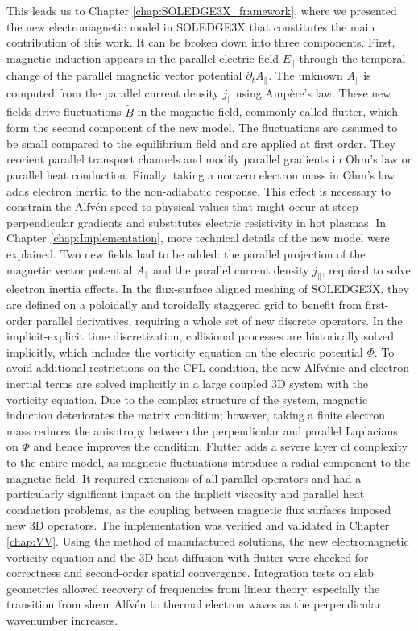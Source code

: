 This leads us to Chapter \ref{chap:SOLEDGE3X_framework}, where we presented the new electromagnetic model in SOLEDGE3X that constitutes the main contribution of this work. It can be broken down into three components. First, magnetic induction appears in the parallel electric field $E_\parallel$ through the temporal change of the parallel magnetic vector potential $\partial_t A_\parallel$. The unknown $A_\parallel$ is computed from the parallel current density $j_\parallel$ using Ampère's law. These new fields drive fluctuations $\tilde{B}$ in the magnetic field, commonly called flutter, which form the second component of the new model. The fluctuations are assumed to be small compared to the equilibrium field and are applied at first order. They reorient parallel transport channels and modify parallel gradients in Ohm's law or parallel heat conduction. Finally, taking a nonzero electron mass in Ohm's law adds electron inertia to the non-adiabatic response. This effect is necessary to constrain the Alfvén speed to physical values that might occur at steep perpendicular gradients and substitutes electric resistivity in hot plasmas. In Chapter \ref{chap:Implementation}, more technical details of the new model were explained. Two new fields had to be added: the parallel projection of the magnetic vector potential $A_\parallel$ and the parallel current density $j_\parallel$, required to solve electron inertia effects. In the flux-surface aligned meshing of SOLEDGE3X, they are defined on a poloidally and toroidally staggered grid to benefit from first-order parallel derivatives, requiring a whole set of new discrete operators. In the implicit-explicit time discretization, collisional processes are historically solved implicitly, which includes the vorticity equation on the electric potential $\Phi$. To avoid additional restrictions on the CFL condition, the new Alfvénic and electron inertial terms are solved implicitly in a large coupled 3D system with the vorticity equation. Due to the complex structure of the system, magnetic induction deteriorates the matrix condition; however, taking a finite electron mass reduces the anisotropy between the perpendicular and parallel Laplacians on $\Phi$ and hence improves the condition. Flutter adds a severe layer of complexity to the entire model, as magnetic fluctuations introduce a radial component to the magnetic field. It required extensions of all parallel operators and had a particularly significant impact on the implicit viscosity and parallel heat conduction problems, as the coupling between magnetic flux surfaces imposed new 3D operators. The implementation was verified and validated in Chapter \ref{chap:VV}. Using the method of manufactured solutions, the new electromagnetic vorticity equation and the 3D heat diffusion with flutter were checked for correctness and second-order spatial convergence. Integration tests on slab geometries allowed recovery of frequencies from linear theory, especially the transition from shear Alfvén to thermal electron waves as the perpendicular wavenumber increases. \\

